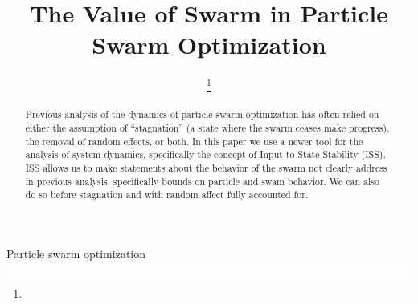 \documentclass[journal]{IEEEtran}
\begin{document}
\title{The Value of Swarm in Particle Swarm Optimization}

\author{

\thanks{}
}

\markboth{}{}

\maketitle

\begin{abstract}
Previous analysis of the dynamics of particle swarm optimization has often relied on either the assumption of ``stagnation'' (a state where the swarm ceases make progress), the removal of random effects, or both.
In this paper we use a newer tool for the analysis of system dynamics, specifically the concept of Input to State Stability (ISS).
ISS allows us to make statements about the behavior of the swarm not clearly address in previous analysis, specifically bounds on particle and swam behavior.
We can also do so before stagnation and with random affect fully accounted for. 
\end{abstract}

\begin{IEEEkeywords}
Particle swarm optimization
\end{IEEEkeywords}

\IEEEpeerreviewmaketitle



















\end{document}
